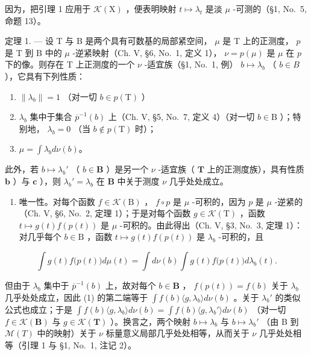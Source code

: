 因为，把引理 1 应用于 \(\mathcal{K}(\mathrm{X})\) ，便表明映射 \(t \mapsto \lambda_t\) 是淡 \(\mu\) -可测的（§1, No.~5, 命题 13）。

定理 1. --- 设 T 与 B 是两个具有可数基的局部紧空间， \(\mu\) 是 T 上的正测度， \(p\) 是 T 到 B 中的 \(\mu\) -逆紧映射（Ch. V, §6, No.~1, 定义 1）， \(\nu = p(\mu)\) 是 \(\mu\) 在 \(p\) 下的像。则存在 T 上正测度的一个 \(\nu\) -适宜族（§1, No.~1, 例） \(b \mapsto \lambda_b\) （ \(b \in B\) ），它具有下列性质：

\begin{enumerate}
\def\labelenumi{\alph{enumi})}
\item
  \(\| \lambda_b\| = 1\) （对一切 \(b\in p(\mathrm{T})\) ）
\item
  \(\lambda_{b}\) 集中于集合 \(\overline{p}^{-1}(b)\) 上（Ch. V, §5, No.~7, 定义 4）（对一切 \(b\in \mathrm{B}\) ）；特别地， \(\lambda_{b} = 0\) （当 \(b\notin p(\mathrm{T})\) 时）；
\item
  \(\mu = \int \lambda_b d\nu(b)\)。
\end{enumerate}

此外，若 \(b \mapsto \lambda_b'\) （ \(b \in \mathbf{B}\) ）是另一个 \(\nu\) -适宜族（ \(\mathbf{T}\) 上的正测度族），具有性质 \(\mathbf{b}\) ）与 \(\mathbf{c}\) ），则 \(\lambda_b' = \lambda_b\) 在 \(\mathbf{B}\) 中关于测度 \(\nu\) 几乎处处成立。

\begin{enumerate}
\def\labelenumi{\arabic{enumi})}
\tightlist
\item
  唯一性。对每个函数 \(f \in \mathcal{K}(\mathrm{B})\) ， \(f \circ p\) 是 \(\mu\) -可积的，因为 \(p\) 是 \(\mu\) -逆紧的（Ch. V, §6, No.~2, 定理 1）；于是对每个函数 \(g \in \mathcal{K}(\mathrm{T})\) ，函数 \(t \mapsto g(t)f(p(t))\) 是 \(\mu\) -可积的。由此得出（Ch. V, §3, No.~3, 定理 1）：对几乎每个 \(b \in \mathrm{B}\) ，函数 \(t \mapsto g(t)f(p(t))\) 是 \(\lambda_b\) -可积的，且
\end{enumerate}

\[
\int g (t) f \bigl (p (t) \bigr) d \mu (t) = \int d \nu (b) \int g (t) f \bigl (p (t) \bigr) d \lambda_ {b} (t).\tag{1}
\]

但由于 \(\lambda_{b}\) 集中于 \(\overline{p}^{-1}(b)\) 上，故对每个 \(b \in \mathbf{B}\) ， \(f(p(t)) = f(b)\) 关于 \(\lambda_{b}\) 几乎处处成立，因此 (1) 的第二端等于 \(\int f(b)\langle g, \lambda_{b} \rangle d\nu(b)\) 。关于 \(\lambda_{b}'\) 的类似公式也成立；于是 \(\int f(b)\langle g, \lambda_{b} \rangle d\nu(b) = \int f(b)\langle g, \lambda_{b}' \rangle d\nu(b)\) （对一切 \(f \in \mathcal{K}(\mathbf{B})\) 与 \(g \in \mathcal{K}(\mathbf{T})\) ）。换言之，两个映射 \(b \mapsto \lambda_{b}\) 与 \(b \mapsto \lambda_{b}'\) （由 B 到 \(\mathcal{M}(T)\) 中的映射）关于 \(\nu\) 标量意义局部几乎处处相等，从而关于 \(\nu\) 几乎处处相等（引理 1 与 §1, No.~1, 注记 2）。

